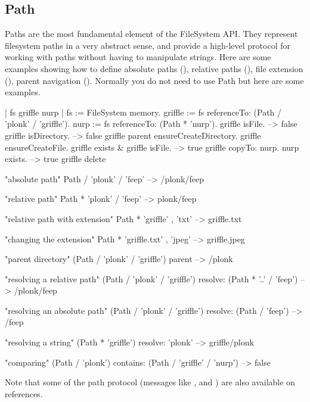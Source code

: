 \documentclass[a4paper,10pt,twoside]{book}
\begin{document}
\subsection{Path}
Paths are the most fundamental element of the FileSystem API. They represent filesystem paths in a very abstract sense, and provide a high-level protocol for working with paths without having to manipulate strings. Here are some examples showing how to define absolute paths (), relative paths (), file extension (), parent navigation ().
Normally you do not need to use Path but here are some examples.

\begin{code}{}
| fs griffle nurp | 
fs := FileSystem memory.
griffle := fs referenceTo: (Path / 'plonk' / 'griffle').
nurp := fs referenceTo: (Path * 'nurp').
griffle isFile.	
    --> false			
griffle isDirectory. 		
    --> false		
griffle parent ensureCreateDirectory.
griffle ensureCreateFile.
griffle exists & griffle isFile.		
    --> true
griffle copyTo: nurp.
nurp exists.			
    --> true	
griffle delete       
\end{code}    

\begin{code}{}
"absolute path"
Path / 'plonk' / 'feep'       --> /plonk/feep
    
"relative path"
Path * 'plonk' / 'feep'       --> plonk/feep

"relative path with extension"
Path * 'griffle' , 'txt'      --> griffle.txt
    
"changing the extension"
Path * 'griffle.txt' , 'jpeg'     --> griffle.jpeg
    
"parent directory"
(Path / 'plonk' / 'griffle') parent   --> /plonk
    
"resolving a relative path"
(Path / 'plonk' / 'griffle') resolve: (Path * '..' / 'feep')
                   --> /plonk/feep
    
"resolving an absolute path"
(Path / 'plonk' / 'griffle') resolve: (Path / 'feep')
                   --> /feep
                                           
"resolving a string"
(Path * 'griffle') resolve: 'plonk'   --> griffle/plonk
                        
"comparing"
(Path / 'plonk') contains: (Path / 'griffle' / 'nurp')
                     --> false
\end{code}

Note that some of the path protocol (messages like \ct{/},  and ) are also available on references.
\end{document}
